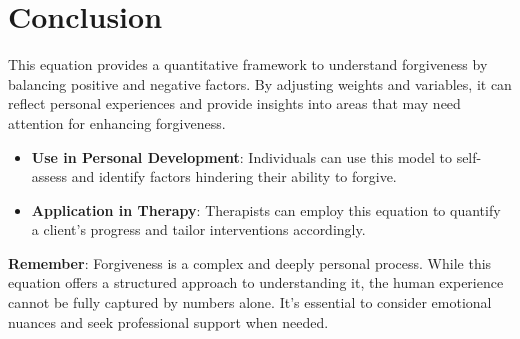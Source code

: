 \documentclass{article}
\begin{document}
\section*{Conclusion}

This equation provides a quantitative framework to understand forgiveness by balancing positive and negative factors. By adjusting weights and variables, it can reflect personal experiences and provide insights into areas that may need attention for enhancing forgiveness.

\begin{itemize}
    \item \textbf{Use in Personal Development}: Individuals can use this model to self-assess and identify factors hindering their ability to forgive.
    \item \textbf{Application in Therapy}: Therapists can employ this equation to quantify a client's progress and tailor interventions accordingly.
\end{itemize}

\textbf{Remember}: Forgiveness is a complex and deeply personal process. While this equation offers a structured approach to understanding it, the human experience cannot be fully captured by numbers alone. It's essential to consider emotional nuances and seek professional support when needed.
\end{document}
